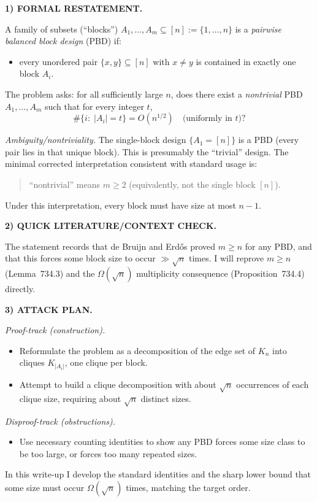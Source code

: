 \noindent\textbf{1) FORMAL RESTATEMENT.}

A family of subsets (``blocks'') $A_1,\dots,A_m\subseteq [n]:=\{1,\dots,n\}$ is a \emph{pairwise balanced block design} (PBD) if:
\begin{itemize}
\item every unordered pair $\{x,y\}\subseteq [n]$ with $x\neq y$ is contained in exactly one block $A_i$.
\end{itemize}
The problem asks: for all sufficiently large $n$, does there exist a \emph{nontrivial} PBD $A_1,\dots,A_m$ such that for every integer $t$,
\[
\#\{i:\;|A_i|=t\}=O(n^{1/2})
\quad\text{(uniformly in $t$)}?
\]

\emph{Ambiguity/nontriviality.} The single-block design $\{A_1=[n]\}$ is a PBD (every pair lies in that unique block). This is presumably the ``trivial'' design. The minimal corrected interpretation consistent with standard usage is:
\begin{quote}
``nontrivial'' means $m\ge 2$ (equivalently, not the single block $[n]$).
\end{quote}
Under this interpretation, every block must have size at most $n-1$.

\medskip
\noindent\textbf{2) QUICK LITERATURE/CONTEXT CHECK.}

The statement records that de Bruijn and Erd\H{o}s proved $m\ge n$ for any PBD, and that this forces some block size to occur $\gg \sqrt n$ times. I will reprove $m\ge n$ (Lemma~734.3) and the $\Omega(\sqrt n)$ multiplicity consequence (Proposition~734.4) directly.

\medskip
\noindent\textbf{3) ATTACK PLAN.}

\emph{Proof-track (construction).}
\begin{itemize}
\item Reformulate the problem as a decomposition of the edge set of $K_n$ into cliques $K_{|A_i|}$, one clique per block.
\item Attempt to build a clique decomposition with about $\sqrt n$ occurrences of each clique size, requiring about $\sqrt n$ distinct sizes.
\end{itemize}
\emph{Disproof-track (obstructions).}
\begin{itemize}
\item Use necessary counting identities to show any PBD forces some size class to be too large, or forces too many repeated sizes.
\end{itemize}
In this write-up I develop the standard identities and the sharp lower bound that some size must occur $\Omega(\sqrt n)$ times, matching the target order.

